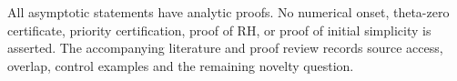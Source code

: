 All asymptotic statements have analytic proofs. No numerical onset,
theta-zero certificate, priority certification, proof of RH, or
proof of initial simplicity is asserted. The accompanying literature
and proof review records source access, overlap, control examples
and the remaining novelty question.

